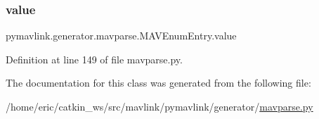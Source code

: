 \subsubsection{\texorpdfstring{value}{value}}
{\footnotesize\ttfamily pymavlink.\+generator.\+mavparse.\+M\+A\+V\+Enum\+Entry.\+value}



Definition at line 149 of file mavparse.\+py.



The documentation for this class was generated from the following file\+:\begin{DoxyCompactItemize}
\item 
/home/eric/catkin\+\_\+ws/src/mavlink/pymavlink/generator/\mbox{\hyperlink{mavparse_8py}{mavparse.\+py}}\end{DoxyCompactItemize}
